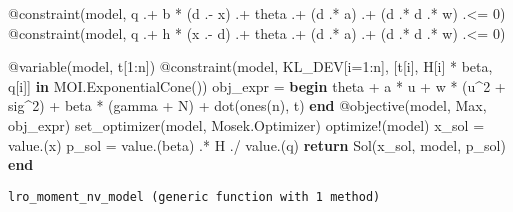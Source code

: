 \documentclass[
  10pt,
  a4paper,
,tablecaptionabove
]{scrartcl}
\newenvironment{Shaded}{}{}
\newcommand{\FloatTok}[1]{\textcolor[rgb]{0.25,0.63,0.44}{#1}}
\newcommand{\KeywordTok}[1]{\textcolor[rgb]{0.00,0.44,0.13}{\textbf{#1}}}
\newcommand{\NormalTok}[1]{#1}
\newcommand{\OperatorTok}[1]{\textcolor[rgb]{0.40,0.40,0.40}{#1}}
\newcommand{\PreprocessorTok}[1]{\textcolor[rgb]{0.74,0.48,0.00}{#1}}
\begin{document}
\begin{Shaded}
\begin{Highlighting}[]
    \PreprocessorTok{@constraint}\NormalTok{(model}\OperatorTok{,}\NormalTok{ q .}\OperatorTok{+}\NormalTok{ b }\OperatorTok{*}\NormalTok{ (d .}\OperatorTok{{-}}\NormalTok{ x) .}\OperatorTok{+}\NormalTok{ theta .}\OperatorTok{+}\NormalTok{ (d }\OperatorTok{.*}\NormalTok{ a) .}\OperatorTok{+}\NormalTok{ (d }\OperatorTok{.*}\NormalTok{ d }\OperatorTok{.*}\NormalTok{ w) .}\OperatorTok{\textless{}=} \FloatTok{0}\NormalTok{)}
    \PreprocessorTok{@constraint}\NormalTok{(model}\OperatorTok{,}\NormalTok{ q .}\OperatorTok{+}\NormalTok{ h }\OperatorTok{*}\NormalTok{ (x .}\OperatorTok{{-}}\NormalTok{ d) .}\OperatorTok{+}\NormalTok{ theta .}\OperatorTok{+}\NormalTok{ (d }\OperatorTok{.*}\NormalTok{ a) .}\OperatorTok{+}\NormalTok{ (d }\OperatorTok{.*}\NormalTok{ d }\OperatorTok{.*}\NormalTok{ w) .}\OperatorTok{\textless{}=} \FloatTok{0}\NormalTok{)}

    \PreprocessorTok{@variable}\NormalTok{(model}\OperatorTok{,}\NormalTok{ t[}\FloatTok{1}\OperatorTok{:}\NormalTok{n])}
    \PreprocessorTok{@constraint}\NormalTok{(model}\OperatorTok{,}\NormalTok{ KL\_DEV[i}\OperatorTok{=}\FloatTok{1}\OperatorTok{:}\NormalTok{n]}\OperatorTok{,}\NormalTok{ [t[i]}\OperatorTok{,}\NormalTok{ H[i] }\OperatorTok{*}\NormalTok{ beta}\OperatorTok{,}\NormalTok{ q[i]] }\KeywordTok{in}\NormalTok{ MOI.ExponentialCone())}
\NormalTok{    obj\_expr }\OperatorTok{=} 
    \KeywordTok{begin}
\NormalTok{        theta }\OperatorTok{+}\NormalTok{ a }\OperatorTok{*}\NormalTok{ u }\OperatorTok{+}\NormalTok{ w }\OperatorTok{*}\NormalTok{ (u}\OperatorTok{\^{}}\FloatTok{2} \OperatorTok{+}\NormalTok{ sig}\OperatorTok{\^{}}\FloatTok{2}\NormalTok{) }\OperatorTok{+}\NormalTok{ beta }\OperatorTok{*}\NormalTok{ (gamma }\OperatorTok{+}\NormalTok{ N) }\OperatorTok{+}\NormalTok{ dot(ones(n)}\OperatorTok{,}\NormalTok{ t)}
    \KeywordTok{end}
    \PreprocessorTok{@objective}\NormalTok{(model}\OperatorTok{,}\NormalTok{ Max}\OperatorTok{,}\NormalTok{ obj\_expr)}
\NormalTok{    set\_optimizer(model}\OperatorTok{,}\NormalTok{ Mosek.Optimizer)}
\NormalTok{    optimize}\OperatorTok{!}\NormalTok{(model)}
\NormalTok{    x\_sol }\OperatorTok{=}\NormalTok{ value.(x)}
\NormalTok{    p\_sol }\OperatorTok{=}\NormalTok{ value.(beta) }\OperatorTok{.*}\NormalTok{ H }\OperatorTok{./}\NormalTok{ value.(q)}
    \KeywordTok{return}\NormalTok{ Sol(x\_sol}\OperatorTok{,}\NormalTok{ model}\OperatorTok{,}\NormalTok{ p\_sol)}
\KeywordTok{end}
\end{Highlighting}
\end{Shaded}

\begin{verbatim}
lro_moment_nv_model (generic function with 1 method)
\end{verbatim}
\end{document}
